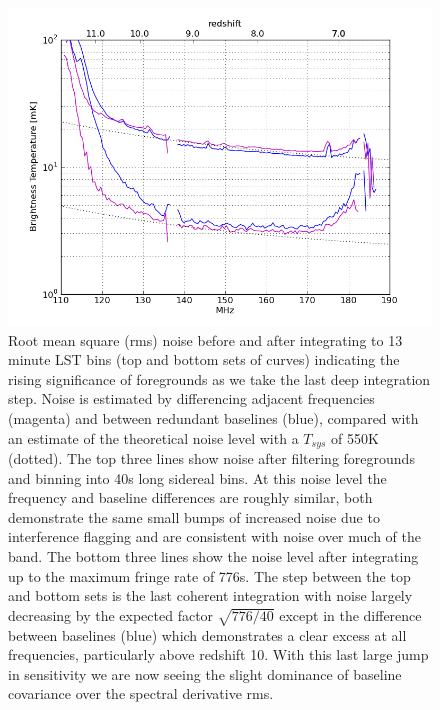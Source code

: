 \documentclass{aastex}
\begin{document}
\begin{figure}
\centering
\includegraphics[width=\columnwidth]{figures/psa32_trms_with_and_without_fr_filtering_z.png}
\caption{\label{fig:noise} Root mean square (rms) noise before and after integrating to 13 minute LST bins (top and bottom sets of curves) indicating the rising significance of foregrounds as we take the last deep integration step. Noise is estimated by differencing adjacent frequencies (magenta) and between redundant baselines (blue), compared with an estimate of the theoretical noise level with a $T_{sys}$ of 550K (dotted). The top three lines show noise after filtering foregrounds and binning into 40s long sidereal bins.  At this noise level the frequency and baseline differences are roughly similar, both demonstrate the same small bumps of increased noise due to interference flagging and are consistent with noise over much of the band.  The bottom three lines show the noise level after integrating up to the maximum fringe rate of 776s. The step between the top and bottom sets is the last coherent integration with noise largely decreasing by the expected factor $\sqrt{776/40}$ except in the difference between baselines (blue) which demonstrates a clear excess at all frequencies, particularly above redshift 10. With this last large jump in sensitivity we are now seeing the slight dominance of baseline covariance over the spectral derivative rms. }
\end{figure}
\end{document}
